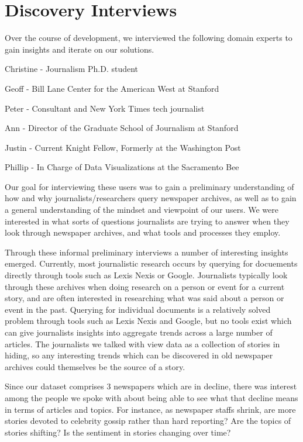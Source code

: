 \section{Discovery Interviews}

Over the course of development, we interviewed the following domain experts to gain insights and iterate on our solutions.
\begin{itemize*}
\item Christine - Journalism Ph.D. student
\item Geoff - Bill Lane Center for the American West at Stanford
\item Peter - Consultant and New York Times tech journalist
\item Ann - Director of the Graduate School of Journalism at Stanford
\item Justin - Current Knight Fellow, Formerly at the Washington Post
\item Phillip - In Charge of Data Visualizations at the Sacramento Bee
\end{itemize*}

Our goal for interviewing these users was to gain a preliminary understanding of how and why journalists/researchers query newspaper archives, as well as to gain a general understanding of the mindset and viewpoint of our users. 
We were interested in what sorts of questions journalists are trying to answer when they look through newspaper archives, and what tools and processes they employ.

Through these informal preliminary interviews a number of interesting insights emerged. Currently, most journalistic research occurs by querying for docuements directly through tools such as Lexis Nexis or Google. 
Journalists typically look through these archives when doing research on a person or event for a current story, and are often interested in researching what was said about a person or event in the past.
Querying for individual documents is a relatively solved problem through tools such as Lexis Nexis and Google, but no tools exist which can give journalists insights into aggregate trends across a large number of articles. 
The journalists we talked with view data as a collection of stories in hiding, so any interesting trends which can be discovered in old newspaper archives could themselves be the source of a story.

Since our dataset comprises 3 newspapers which are in decline, there was interest among the people we spoke with about being able to see what that decline means in terms of articles and topics. For instance, as newspaper staffs shrink, are more stories devoted to celebrity gossip rather than hard reporting? Are the topics of stories shifting? Is the sentiment in stories changing over time?

